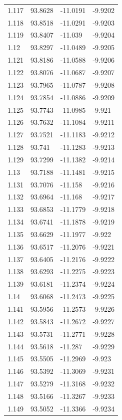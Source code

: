 \begin{tabular}{llll}
1.117 & 93.8628 & -11.0191 & -9.9202 \\
1.118 & 93.8518 & -11.0291 & -9.9203 \\
1.119 & 93.8407 & -11.039 & -9.9204 \\
1.12 & 93.8297 & -11.0489 & -9.9205 \\
1.121 & 93.8186 & -11.0588 & -9.9206 \\
1.122 & 93.8076 & -11.0687 & -9.9207 \\
1.123 & 93.7965 & -11.0787 & -9.9208 \\
1.124 & 93.7854 & -11.0886 & -9.9209 \\
1.125 & 93.7743 & -11.0985 & -9.921 \\
1.126 & 93.7632 & -11.1084 & -9.9211 \\
1.127 & 93.7521 & -11.1183 & -9.9212 \\
1.128 & 93.741 & -11.1283 & -9.9213 \\
1.129 & 93.7299 & -11.1382 & -9.9214 \\
1.13 & 93.7188 & -11.1481 & -9.9215 \\
1.131 & 93.7076 & -11.158 & -9.9216 \\
1.132 & 93.6964 & -11.168 & -9.9217 \\
1.133 & 93.6853 & -11.1779 & -9.9218 \\
1.134 & 93.6741 & -11.1878 & -9.9219 \\
1.135 & 93.6629 & -11.1977 & -9.922 \\
1.136 & 93.6517 & -11.2076 & -9.9221 \\
1.137 & 93.6405 & -11.2176 & -9.9222 \\
1.138 & 93.6293 & -11.2275 & -9.9223 \\
1.139 & 93.6181 & -11.2374 & -9.9224 \\
1.14 & 93.6068 & -11.2473 & -9.9225 \\
1.141 & 93.5956 & -11.2573 & -9.9226 \\
1.142 & 93.5843 & -11.2672 & -9.9227 \\
1.143 & 93.5731 & -11.2771 & -9.9228 \\
1.144 & 93.5618 & -11.287 & -9.9229 \\
1.145 & 93.5505 & -11.2969 & -9.923 \\
1.146 & 93.5392 & -11.3069 & -9.9231 \\
1.147 & 93.5279 & -11.3168 & -9.9232 \\
1.148 & 93.5166 & -11.3267 & -9.9233 \\
1.149 & 93.5052 & -11.3366 & -9.9234 \\

\end{tabular}
